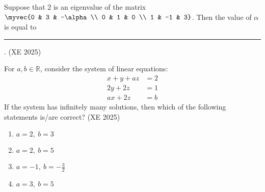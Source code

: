 \item Suppose that $2$ is an eigenvalue of the matrix  
	$
    \myvec{0 & 3 & -\alpha \\ 0 & 1 & 0 \\ 1 & -1 & 3}
    $.
Then the value of $\alpha$ is equal to \rule{1cm}{0.15mm}.
\hfill (XE 2025)
\item For $a,b \in \mathbb{R}$, consider the system of linear equations:  
\begin{align*}
x+y+az&=2\\  2y+2z&=1\\  ax+2z&=b
\end{align*}  
If the system has infinitely many solutions, then which of the following statements is/are correct?
\hfill (XE 2025)
\begin{multicols}{4}
\begin{enumerate}
\item $a=2,\ b=3$
\item $a=2,\ b=5$
\item $a=-1,\ b=-\frac{3}{2}$
\item $a=3,\ b=5$
\end{enumerate}
\end{multicols}

